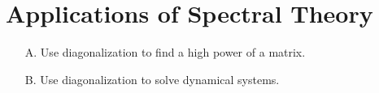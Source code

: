 \section{Applications of Spectral Theory}

\begin{outcome}
\begin{enumerate}
\item[A.] Use diagonalization to find a high power of a matrix.

\item[B.] Use diagonalization to solve dynamical systems.
\end{enumerate}
\end{outcome}